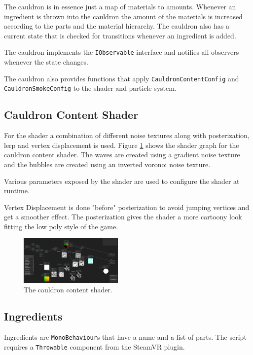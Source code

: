 \documentclass{vgtc}
\begin{document}
The cauldron is in essence just a map of materials to amounts. Whenever an ingredient is thrown into the cauldron
the amount of the materials is increased according to the parts and the material hierarchy. The cauldron also has
a current state that is checked for transitions whenever an ingredient is added.

The cauldron implements the \texttt{IObservable} interface and notifies all observers whenever the state changes.

The cauldron also provides functions that apply \texttt{CauldronContentConfig} and \texttt{CauldronSmokeConfig} to
the shader and particle system.

\subsection{Cauldron Content Shader}

For the shader a combination of different noise textures along with posterization, lerp and vertex displacement is used. 
Figure \ref{fig:CauldronContentShader} shows the shader graph for the cauldron content shader. The waves are created
using a gradient noise texture and the bubbles are created using an inverted voronoi noise texture.

Various parameters exposed by the shader are used to configure the shader at runtime. 

Vertex Displacement is done "before" posterization to avoid jumping vertices and get a smoother effect. The posterization
gives the shader a more cartoony look fitting the low poly style of the game.

\begin{figure}
  \centering
  \includegraphics[width=0.45\textwidth]{pictures/Shader.png}
  \caption{The cauldron content shader.}
  \label{fig:CauldronContentShader}
\end{figure}

\subsection{Ingredients}

Ingredients are \texttt{MonoBehaviour}s that have a name and a list of parts. The script requires a \texttt{Throwable}
component from the SteamVR plugin.
\end{document}
